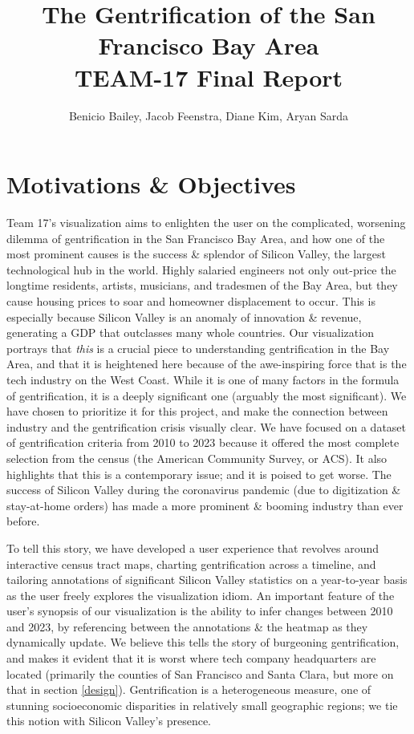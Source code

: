 \documentclass{article}
\title{The Gentrification of the San Francisco Bay Area \\ \large TEAM-17 Final Report}
\author{Benicio Bailey, Jacob Feenstra, Diane Kim, Aryan Sarda}
\begin{document}
\maketitle

\section{Motivations \& Objectives}

    Team 17's visualization aims to enlighten the user on the complicated, worsening dilemma of gentrification in the San Francisco Bay Area, and how one of the most prominent causes is the success \& splendor of Silicon Valley, the largest technological hub in the world. Highly salaried engineers not only out-price the longtime residents, artists, musicians, and tradesmen of the Bay Area, but they cause housing prices to soar and homeowner displacement to occur. This is especially because Silicon Valley is an anomaly of innovation \& revenue, generating a GDP that outclasses many whole countries. Our visualization portrays that \textit{this} is a crucial piece to understanding gentrification in the Bay Area, and that it is heightened here because of the awe-inspiring force that is the tech industry on the West Coast. While it is one of many factors in the formula of gentrification, it is a deeply significant one (arguably the most significant). We have chosen to prioritize it for this project, and make the connection between industry and the gentrification crisis visually clear. We have focused on a dataset of gentrification criteria from 2010 to 2023 because it offered the most complete selection from the census (the American Community Survey, or ACS). It also highlights that this is a contemporary issue; and it is poised to get worse. The success of Silicon Valley during the coronavirus pandemic (due to digitization \& stay-at-home orders) has made a more prominent \& booming industry than ever before.
    
    To tell this story, we have developed a user experience that revolves around interactive census tract maps, charting gentrification across a timeline, and tailoring annotations of significant Silicon Valley statistics on a year-to-year basis as the user freely explores the visualization idiom. An important feature of the user's synopsis of our visualization is the ability to infer changes between 2010 and 2023, by referencing between the annotations \& the heatmap as they dynamically update. We believe this tells the story of burgeoning gentrification, and makes it evident that it is worst where tech company headquarters are located (primarily the counties of San Francisco and Santa Clara, but more on that in section \ref{design}). Gentrification is a heterogeneous measure, one of stunning socioeconomic disparities in relatively small geographic regions; we tie this notion with Silicon Valley's presence.
    
\end{document}
